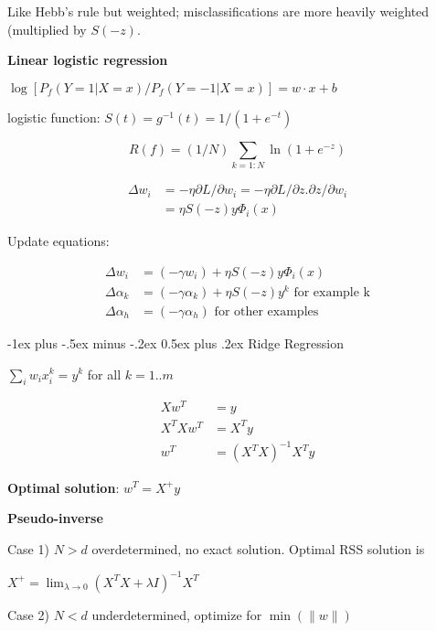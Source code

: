 \documentclass[10pt,landscape]{article}
\makeatletter
\renewcommand{\section}{\@startsection{section}{1}{0mm}%
                                {-1ex plus -.5ex minus -.2ex}%
                                {0.5ex plus .2ex}%
                                {\normalfont\large\bfseries}}
\makeatother
\begin{document}
\begin{multicols}{3}
Like Hebb's rule but weighted; misclassifications are more heavily weighted (multiplied by $S(-z)$.

\textbf{Linear logistic regression}

$\log [P_f (Y=1 | X=x) / P_f (Y=-1 | X=x)] = w \cdot x + b$

logistic function: $S(t) = g^{-1}(t) = 1 / (1+e^{-t})$

\begin{equation*}
R(f) = (1/N) \sum_{k=1:N} \ln(1+e^{-z})
\end{equation*}

\begin{align*}
\Delta w_i &= -\eta \partial L  / \partial w_i 
= -\eta \partial L / \partial z . \partial z / \partial w_i \\
&= \eta S(-z) y \Phi_i (x)
\end{align*}

Update equations:

\begin{align*}
\Delta w_i &= (-\gamma w_i) + \eta S(-z) y \Phi_i (x) \\
\Delta \alpha_k &= (-\gamma \alpha_k) + \eta S(-z) y^k \text{ for example k} \\
\Delta \alpha_h &= (-\gamma \alpha_h) \text{ for other examples}
\end{align*}


\section{Ridge Regression}

$\sum_i w_i x^k_i = y^k$ for all $k=1..m$

\begin{align*}
Xw^T &= y \\
X^T X w^T &= X^T y \\
w^T &= (X^T X)^{-1} X^T y
\end{align*}

\textbf{Optimal solution}: $w^T = X^+ y$

\textbf{Pseudo-inverse}

Case 1) $N > d$ overdetermined, no exact solution. Optimal RSS solution is

$X^+ = \lim_{\lambda \rightarrow 0} (X^T X + \lambda I)^{-1} X^T$

Case 2) $N < d$ underdetermined, optimize for $\min(\lVert w \rVert)$


\end{multicols}
\end{document}
